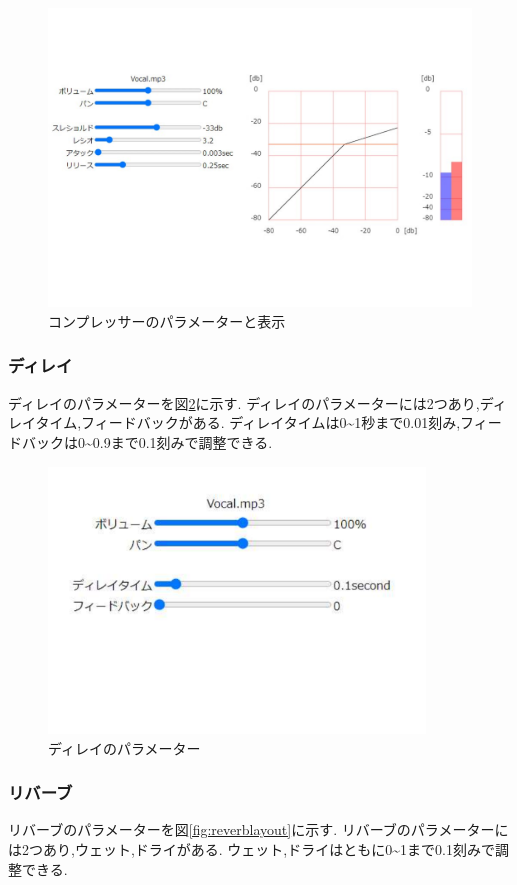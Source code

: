 \documentclass[12pt,a4j,titlepage]{ltjsarticle}
\begin{document}
\begin{figure}[H]
\centering
 \includegraphics[width=150mm]{./figures/Complayout.pdf}
 \caption{コンプレッサーのパラメーターと表示}
 \label{fig:Complayout}
\end{figure}

\subsubsection{ディレイ}
ディレイのパラメーターを図\ref{fig:delaylayout}に示す.
ディレイのパラメーターには2つあり,ディレイタイム,フィードバックがある.
ディレイタイムは0\sim1秒まで0.01刻み,フィードバックは0\sim0.9まで0.1刻みで調整できる.

\begin{figure}[H]
\centering
 \includegraphics[width=100mm]{./figures/delaylayout.pdf}
 \caption{ディレイのパラメーター}
 \label{fig:delaylayout}
\end{figure}

\subsubsection{リバーブ}
リバーブのパラメーターを図\ref{fig:reverblayout}に示す.
リバーブのパラメーターには2つあり,ウェット,ドライがある.
ウェット,ドライはともに0\sim1まで0.1刻みで調整できる.
\end{document}
